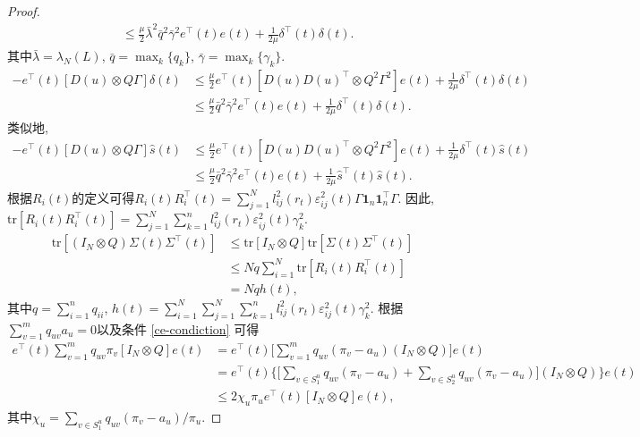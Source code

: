 \begin{proof}
\begin{align}
        &\leq\frac{\mu}{2}\bar{\lambda}^2\bar{q}^2\bar{\gamma}^2 e^\top(t)e(t)+\frac{1}{2\mu}\delta^\top(t)\delta(t).
        \end{align}
        其中$\bar{\lambda}=\lambda_N(L)$, $\bar{q}=\max_k\{q_k\}$, $\bar{\gamma}=\max_{k}\{\gamma_k\}$.
        \begin{align}
        \nonumber-e^\top(t)[D(u)\otimes Q\Gamma]\delta(t)&\leq\frac{\mu}{2}e^\top(t)[D(u)D(u)^\top\otimes Q^2\Gamma^2]e(t)+\frac{1}{2\mu}\delta^\top(t)\delta(t)\\
        &\leq\frac{\mu}{2}\bar{q}^2\bar{\gamma}^2 e^\top(t)e(t)+\frac{1}{2\mu}\delta^\top(t)\delta(t).
        \end{align}
        类似地,
        \begin{align}
        \nonumber-e^\top(t)[D(u)\otimes Q\Gamma]\hat{s}(t)&\leq\frac{\mu}{2}e^\top(t)[D(u)D(u)^\top\otimes Q^2\Gamma^2]e(t)+\frac{1}{2\mu}\delta^\top(t)\hat{s}(t)\\
        &\leq\frac{\mu}{2}\bar{q}^2\bar{\gamma}^2e^\top(t)e(t)+\frac{1}{2\mu}\hat{s}^\top(t)\hat{s}(t).
        \end{align}
        根据$R_i(t)$的定义可得$R_i(t)R_i^\top(t)=\sum_{j=1}^Nl^2_{ij}(r_t)\varepsilon^2_{ij}(t)\Gamma\mathbf{1}_n\mathbf{1}_n^\top\Gamma$. 因此, $\text{tr}[R_i(t)R_i^\top(t)]=\sum_{j=1}^N\sum_{k=1}^nl^2_{ij}(r_t)\varepsilon^2_{ij}(t)\gamma_k^2$.
        \begin{align}\label{tr}
        \nonumber\text{tr}[(I_N\otimes Q)\Sigma(t)\Sigma^\top(t)]&\leq\text{tr}[I_N\otimes Q]\text{tr}[\Sigma(t)\Sigma^\top(t)]\\
        \nonumber&\leq Nq\sum_{i=1}^N\text{tr}[R_i(t)R_i^\top(t)]\\
        &=Nqh(t),
        \end{align}
        其中$q=\sum_{i=1}^nq_{ii}$, $h(t)=\sum_{i=1}^N\sum_{j=1}^N\sum_{k=1}^nl^2_{ij}(r_t)\varepsilon^2_{ij}(t)\gamma_k^2$.
        根据$\sum_{v=1}^{m}q_{uv}a_u=0$以及条件 \eqref{ce-condiction} 可得
        \begin{align}\label{quv}
        \nonumber e^\top(t)\sum_{v=1}^{m}q_{uv}\pi_v[I_N\otimes Q]e(t)&=e^\top(t)\Big[\sum_{v=1}^{m}q_{uv}(\pi_v-a_u)(I_N\otimes Q)\Big]e(t)\\
        \nonumber&=e^\top(t)\Big\{\Big[\sum_{v\in S_1^u}q_{uv}(\pi_v-a_u)+\sum_{v\in S_2^u}q_{uv}(\pi_v-a_u)\Big](I_N\otimes Q)\Big\}e(t)\\
        &\leq 2\chi_u\pi_ue^\top(t)[I_N\otimes Q]e(t),
        \end{align}
        其中$\chi_u=\sum_{v\in S_1^u}q_{uv}(\pi_v-a_u)/\pi_u$.


\end{proof}
